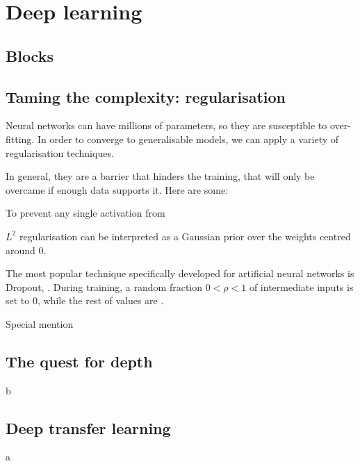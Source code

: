 \chapter{Deep learning}
\section{Blocks}
\section{Taming the complexity: regularisation}
Neural networks can have millions of parameters, so they are susceptible to over-fitting.
In order to converge to generalisable models, we can apply a variety of regularisation techniques.

In general, they are a barrier that hinders the training, that will only be overcame if enough data supports it.
Here are some:

To prevent any single activation from

$L^2$ regularisation can be interpreted as a Gaussian prior over the weights centred around $0$.

The most popular technique specifically developed for artificial neural networks is Dropout, \citep{dropout}.
During training, a random fraction $0 < \rho < 1$ of intermediate inputs is set to $0$, while the rest of values are .


Special mention


\section{The quest for depth}
b
\section{Deep transfer learning}
a

